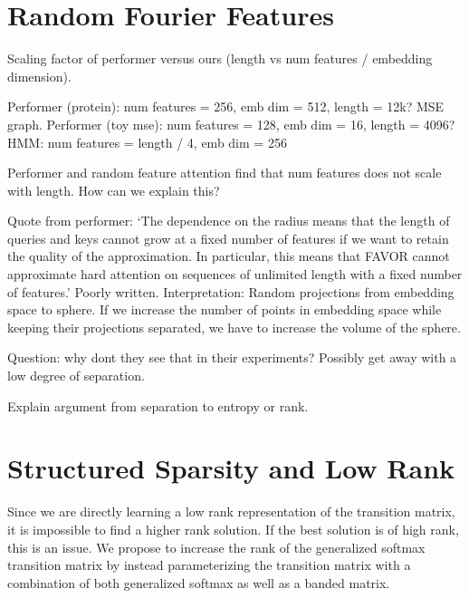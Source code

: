 \documentclass{article}
\begin{document}
\section{Random Fourier Features}
Scaling factor of performer versus ours (length vs num features / embedding dimension).

Performer (protein): num features = 256, emb dim = 512, length = 12k?
MSE graph.
Performer (toy mse): num features = 128, emb dim = 16, length = 4096?
HMM: num features = length / 4, emb dim = 256

Performer and random feature attention find that num features does not scale with
length. How can we explain this?

Quote from performer:
`The dependence on the radius means that the length of queries and keys cannot grow
at a fixed number of features if we want to
retain the quality of the approximation.
In particular, this means that FAVOR cannot approximate
hard attention on sequences of unlimited length with a fixed number of features.'
Poorly written.
Interpretation: Random projections from embedding space to sphere.
If we increase the number of points in embedding space while keeping
their projections separated, we have to increase the volume of the sphere.

Question: why dont they see that in their experiments?
Possibly get away with a low degree of separation.

Explain argument from separation to entropy or rank.

\section{Structured Sparsity and Low Rank}
Since we are directly learning a low rank representation of the transition matrix,
it is impossible to find a higher rank solution.
If the best solution is of high rank, this is an issue.
We propose to increase the rank of the generalized softmax transition matrix
by instead parameterizing the transition matrix with a combination of both generalized softmax
as well as a banded matrix.
\end{document}
